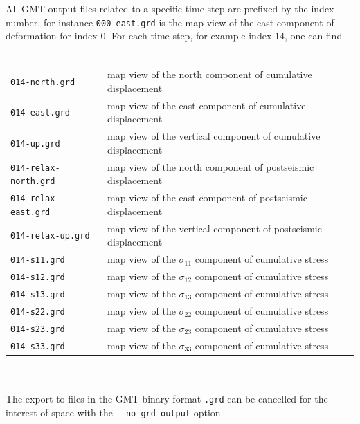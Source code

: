 \documentclass[10pt]{article}
\begin{document}
All GMT output files related to a specific time step are prefixed by the index number, for instance \verb'000-east.grd' is the map view of the east component of deformation for index $0$. For each time step, for example index $14$, one can find\\
\\
\begin{tabular}{ll}
\verb'014-north.grd' & map view of the north component of cumulative displacement\\
\verb'014-east.grd' & map view of the east component of cumulative displacement\\
\verb'014-up.grd' & map view of the vertical component of cumulative displacement\\
\verb'014-relax-north.grd' & map view of the north component of postseismic displacement\\
\verb'014-relax-east.grd' & map view of the east component of postseismic displacement\\
\verb'014-relax-up.grd' & map view of the vertical component of postseismic displacement\\
\verb'014-s11.grd' & map view of the $\sigma_{11}$ component of cumulative stress\\
\verb'014-s12.grd' & map view of the $\sigma_{12}$ component of cumulative stress\\
\verb'014-s13.grd' & map view of the $\sigma_{13}$ component of cumulative stress\\
\verb'014-s22.grd' & map view of the $\sigma_{22}$ component of cumulative stress\\
\verb'014-s23.grd' & map view of the $\sigma_{23}$ component of cumulative stress\\
\verb'014-s33.grd' & map view of the $\sigma_{33}$ component of cumulative stress\\
\end{tabular}\\
\\
The export to files in the GMT binary format \verb'.grd' can be cancelled for the interest of space with the \verb'--no-grd-output' option.
\end{document}
